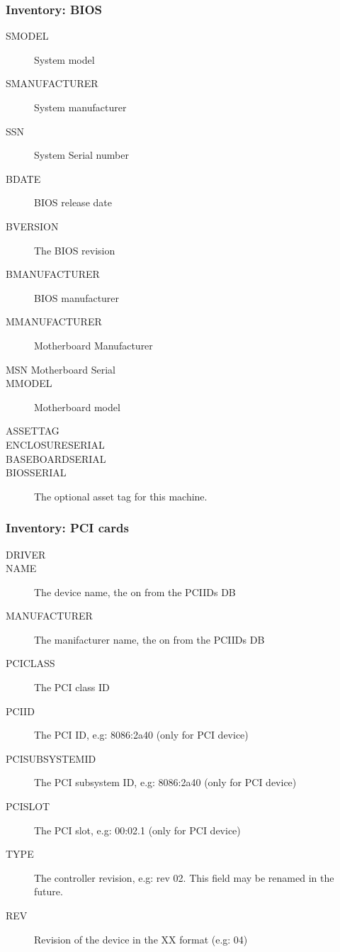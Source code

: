 \documentclass{beamer}
\begin{document}
\begin{frame}
\frametitle{Inventory: BIOS}
\begin{description}
      \item[SMODEL] System model
      \item[SMANUFACTURER] System manufacturer
      \item[SSN] System Serial number
      \item[BDATE] BIOS release date
      \item[BVERSION] The BIOS revision
      \item[BMANUFACTURER] BIOS manufacturer
      \item[MMANUFACTURER] Motherboard Manufacturer
      \item[MSN Motherboard Serial]
      \item[MMODEL] Motherboard model
      \item[ASSETTAG]
      \item[ENCLOSURESERIAL]
      \item[BASEBOARDSERIAL]
      \item[BIOSSERIAL] The optional asset tag for this machine.
\end{description}

\end{frame}
\begin{frame}

\frametitle{Inventory: PCI cards}
\begin{description}
      \item[DRIVER]
      \item[NAME] The device name, the on from the PCIIDs DB
      \item[MANUFACTURER] The manifacturer name, the on from the PCIIDs DB
      \item[PCICLASS] The PCI class ID
      \item[PCIID] The PCI ID, e.g: 8086:2a40 (only for PCI device)
      \item[PCISUBSYSTEMID] The PCI subsystem ID, e.g: 8086:2a40 (only for PCI device)
      \item[PCISLOT] The PCI slot, e.g: 00:02.1 (only for PCI device)
      \item[TYPE] The controller revision, e.g: rev 02. This field may be renamed in the future.
      \item[REV] Revision of the device in the XX format (e.g: 04)
\end{description}
\end{frame}
\end{document}
